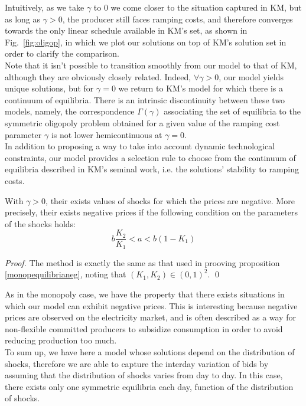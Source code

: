 Intuitively, as we take $\gamma$ to $0$ we come closer to the situation captured in KM, but as long as $\gamma>0$, the producer still faces ramping costs, and therefore converges towards the only linear schedule available in KM's set, as shown in Fig.~\ref{fig:oligop}, in which we plot our solutions on top of KM's solution set in order to clarify the comparison. \\

Note that it isn't possible to transition smoothly from our model to that of KM, although they are obviously closely related. Indeed, $\forall \gamma>0$, our model yields unique solutions, but for $\gamma=0$ we return to KM's model for which there is a continuum of equilibria. There is an intrinsic discontinuity between these two models, namely, the correspondence $\Gamma(\gamma)$ associating the set of equilibria to the symmetric oligopoly problem obtained for a given value of the ramping cost parameter $\gamma$ is not lower hemicontinuous at $\gamma=0$. \\

In addition to proposing a way to take into account dynamic technological constraints, our model provides a selection rule to choose from the continuum of equilibria described in KM's seminal work, i.e. the solutions' stability to ramping costs.\\

\begin{proposition}\label{oligoequilibrianeg}
With $\gamma > 0 $, their exists values of shocks for which the prices are negative. More precisely, their exists negative prices if the following condition on the parameters of the shocks holds:
$$b\frac{K_2}{K_1}<a<b(1-K_1)$$
\end{proposition}
\begin{proof}
The method is exactly the same as that used in prooving proposition \ref{monopequilibrianeg}, noting that $(K_1, K_2)\in (0,1)^2$. \qed
\end{proof}

As in the monopoly case, we have the property that there exists situations in which our model can exhibit negative prices. This is interesting because negative prices are observed on the electricity market, and is often described as a way for non-flexible committed producers to subsidize consumption in order to avoid reducing production too much.\\

To sum up, we have here a model whose solutions depend on the distribution of shocks, therefore we are able to capture the interday variation of bids by assuming that the distribution of shocks varies from day to day. In this case, there exists only one symmetric equilibria each day, function of the distribution of shocks.\\

